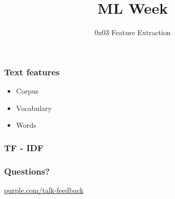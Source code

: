 
\title
{ML Week}
\subtitle{0x03 \hspace{2mm}  Feature Extraction}




\begin{frame}
  \titlepage
\end{frame}


\begin{frame}[t]

\end{frame}

\begin{frame}
  \frametitle{Text features}
  \begin{itemize}
  \item Corpus
  \item Vocabulary
  \item Words
  \end{itemize}
\end{frame}

\begin{frame}
\end{frame}

\begin{frame}
  \frametitle{TF - IDF}
  
\end{frame}


\begin{frame}
  \frametitle{Questions?}
  \centerline{\large\url{purple.com/talk-feedback}}
\end{frame}


